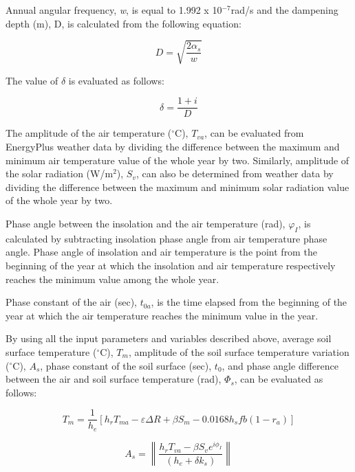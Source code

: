 Annual angular frequency, \emph{w}, is equal to 1.992 x 10\(^{-7}\)rad/s and the dampening depth (m), D, is calculated from the following equation:

\begin{equation}
D = \sqrt {\frac{{2{\alpha_s}}}{w}}
\end{equation}

The value of \({\delta}\) is evaluated as follows:

\begin{equation}
\delta  = \frac{{1 + i}}{D}
\end{equation}

The amplitude of the air temperature (\(^{\circ}\)C), \(T_{va}\), can be evaluated from EnergyPlus weather data by dividing the difference between the maximum and minimum air temperature value of the whole year by two. Similarly, amplitude of the solar radiation (W/m\(^{2}\)), \(S_{v}\), can also be determined from weather data by dividing the difference between the maximum and minimum solar radiation value of the whole year by two.

Phase angle between the insolation and the air temperature (rad), \({\varphi_{I}}\), is calculated by subtracting insolation phase angle from air temperature phase angle. Phase angle of insolation and air temperature is the point from the beginning of the year at which the insolation and air temperature respectively reaches the minimum value among the whole year.

Phase constant of the air (sec), \(t_{0a}\), is the time elapsed from the beginning of the year at which the air temperature reaches the minimum value in the year.

By using all the input parameters and variables described above, average soil surface temperature (\(^{\circ}\)C), \(T_{m}\), amplitude of the soil surface temperature variation (\(^{\circ}\)C), \({A_{s}}\), phase constant of the soil surface (sec), \(t_{0}\), and phase angle difference between the air and soil surface temperature (rad), \({\Phi_{s}}\), can be evaluated as follows:

\begin{equation}
{T_m} = \frac{1}{{{h_e}}}\left[ {{h_r}{T_{ma}} - \varepsilon \Delta R + \beta {S_m} - 0.0168{h_s}fb\left( {1 - {r_a}} \right)} \right]
\end{equation}

\begin{equation}
{A_s} = \left\| {\frac{{{h_r}{T_{va}} - \beta {S_v}{e^{i{\phi_I}}}}}{{\left( {{h_e} + \delta {k_s}} \right)}}} \right\|
\end{equation}

